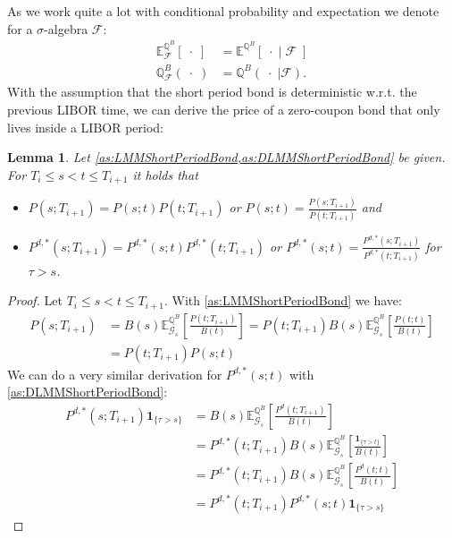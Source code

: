 \documentclass[12pt]{article}
\newtheorem{lemma}[theorem]{Lemma}
\begin{document}
	As we work quite a lot with conditional probability and expectation we denote for a $\sigma$-algebra $\mathcal{F}$:
	\begin{align*}
		\mathbb{E}^{\mathbb{Q}^B}_{\mathcal{F}}\left[ \; \cdot \; \right] &=  \mathbb{E}^{\mathbb{Q}^B}\left[ \; \cdot \; | \; \mathcal{F} \; \right]\\
		\mathbb{Q}^B_{\mathcal{F}}\left(\;\cdot \; \right) &= \mathbb{Q}^B\left( \left. \;\cdot \; \right| \mathcal{F} \right).
	\end{align*} 
	With the assumption that the short period bond is deterministic w.r.t. the previous LIBOR time, we can derive the price of a zero-coupon bond that only lives inside a LIBOR period:
	\begin{lemma}
		Let \cref{as:LMMShortPeriodBond,as:DLMMShortPeriodBond} be given. For $T_i \le s < t \le T_{i+1}$ it holds that
		\begin{itemize}
			\item $P(s;T_{i+1}) = P(s;t)P(t;T_{i+1})$ or 
			$P(s;t) = \frac{P(s;T_{i+1})}{P(t;T_{i+1})}$ and
			\item $P^{d,*}(s;T_{i+1}) = P^{d,*}(s;t)P^{d,*}(t;T_{i+1})$ or 
			$P^{d,*}(s;t) = \frac{P^{d,*}(s;T_{i+1})}{P^{d,*}(t;T_{i+1})}$ for $\tau > s$.
		\end{itemize}
	\end{lemma}
	\begin{proof}
		Let $T_i \le s < t \le T_{i+1}$. With \cref{as:LMMShortPeriodBond} we have: 
		\begin{align*}
			P(s;T_{i+1}) &= B(s) \mathbb{E}^{\mathbb{Q}^B}_{\mathcal{G}_s}\left[\frac{P(t;T_{i+1})}{B(t)} \right] = P(t;T_{i+1})B(s)\mathbb{E}^{\mathbb{Q}^B}_{\mathcal{G}_s}\left[\frac{P(t;t)}{B(t)}\right]\\
			&=P(t;T_{i+1})P(s;t)
		\end{align*}
		We can do a very similar derivation for $P^{d,*}(s;t)$ with \cref{as:DLMMShortPeriodBond}:
		\begin{align*}
			P^{d,*}(s;T_{i+1}) \mathbf{1}_{\{\tau > s\}} &= B(s)\mathbb{E}^{\mathbb{Q}^B}_{\mathcal{G}_{s}}\left[\frac{P^d(t;T_{i+1})}{B(t)} \right]\\
			&= P^{d,*}(t;T_{i+1}) B(s)\mathbb{E}^{\mathbb{Q}^B}_{\mathcal{G}_{s}}\left[\frac{\mathbf{1}_{\{\tau > t\}}}{B(t)} \right]\\
			&= P^{d,*}(t;T_{i+1}) B(s)\mathbb{E}^{\mathbb{Q}^B}_{\mathcal{G}_{s}}\left[\frac{P^d(t;t)}{B(t)} \right] \\
			&= P^{d,*}(t;T_{i+1})P^{d,*}(s;t)\mathbf{1}_{\{\tau > s\}}
		\end{align*}
	\end{proof}
\end{document}
